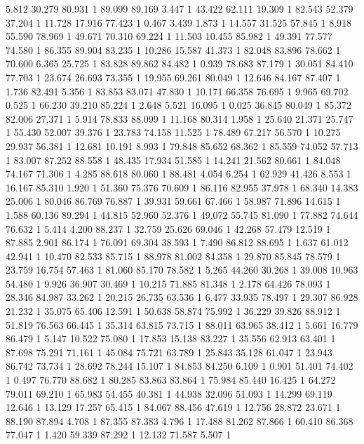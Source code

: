 	5.812	30.279	80.931	1
	89.099	89.169	3.447	1
	43.422	62.111	19.309	1
	82.543	52.379	37.204	1
	11.728	17.916	77.423	1
	0.467	3.439	1.873	1
	14.557	31.525	57.845	1
	8.918	55.590	78.969	1
	49.671	70.310	69.224	1
	11.503	10.455	85.982	1
	49.391	77.577	74.580	1
	86.355	89.904	83.235	1
	10.286	15.587	41.373	1
	82.048	83.896	78.662	1
	70.600	6.365	25.725	1
	83.828	89.862	84.482	1
	0.939	78.683	87.179	1
	30.051	84.410	77.703	1
	23.674	26.693	73.355	1
	19.955	69.261	80.049	1
	12.646	84.167	87.407	1
	1.736	82.491	5.356	1
	83.853	83.071	47.830	1
	10.171	66.358	76.695	1
	9.965	69.702	0.525	1
	66.230	39.210	85.224	1
	2.648	5.521	16.095	1
	0.025	36.845	80.049	1
	85.372	82.006	27.371	1
	5.914	78.833	88.099	1
	11.168	80.314	1.958	1
	25.640	21.371	25.747	1
	55.430	52.007	39.376	1
	23.783	74.158	11.525	1
	78.489	67.217	56.570	1
	10.275	29.937	56.381	1
	12.681	10.191	8.993	1
	79.848	85.652	68.362	1
	85.559	74.052	57.713	1
	83.007	87.252	88.558	1
	48.435	17.934	51.585	1
	14.241	21.562	80.661	1
	84.048	74.167	71.306	1
	4.285	88.618	80.060	1
	88.481	4.054	6.254	1
	62.929	41.426	8.553	1
	16.167	85.310	1.920	1
	51.360	75.376	70.609	1
	86.116	82.955	37.978	1
	68.340	14.383	25.006	1
	80.046	86.769	76.887	1
	39.931	59.661	67.466	1
	58.987	71.896	14.615	1
	1.588	60.136	89.294	1
	44.815	52.960	52.376	1
	49.072	55.745	81.090	1
	77.882	74.644	76.632	1
	5.414	4.200	88.237	1
	32.759	25.626	69.046	1
	42.268	57.479	12.519	1
	87.885	2.901	86.174	1
	76.091	69.304	38.593	1
	7.490	86.812	88.695	1
	1.637	61.012	42.941	1
	10.470	82.533	85.715	1
	88.978	81.002	84.358	1
	29.870	85.845	78.579	1
	23.759	16.754	57.463	1
	81.060	85.170	78.582	1
	5.265	44.260	30.268	1
	39.008	10.963	54.480	1
	9.926	36.907	30.469	1
	10.215	71.885	81.348	1
	2.178	64.426	78.093	1
	28.346	84.987	33.262	1
	20.215	26.735	63.536	1
	6.477	33.935	78.497	1
	29.307	86.928	21.232	1
	35.075	65.406	12.591	1
	50.638	58.874	75.992	1
	36.229	39.826	88.912	1
	51.819	76.563	66.445	1
	35.314	63.815	73.715	1
	88.011	63.965	38.412	1
	5.661	16.779	86.479	1
	5.147	10.522	75.080	1
	17.853	15.138	83.227	1
	35.556	62.913	63.401	1
	87.698	75.291	71.161	1
	45.084	75.721	63.789	1
	25.843	35.128	61.047	1
	23.943	86.742	73.734	1
	28.692	78.244	15.107	1
	84.853	84.250	6.109	1
	0.901	51.401	74.402	1
	0.497	76.770	88.682	1
	80.285	83.863	83.864	1
	75.984	85.440	16.425	1
	64.272	79.011	69.210	1
	65.983	54.455	40.381	1
	44.938	32.096	51.093	1
	14.299	69.119	12.646	1
	13.129	17.257	65.415	1
	84.067	88.456	47.619	1
	12.756	28.872	23.671	1
	88.190	87.894	4.708	1
	87.355	87.383	4.796	1
	17.488	81.262	87.866	1
	60.410	86.368	77.047	1
	1.420	59.339	87.292	1
	12.132	71.587	5.507	1
